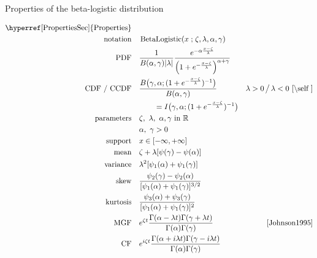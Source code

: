 

\begin{table*}[p]
\caption[Beta-logistic distribution -- Properties]{Properties of the beta-logistic distribution}
\begin{align*}
\text{\hyperref[PropertiesSec]{Properties}}  \quad& \\
\text{notation} \quad &  \op{BetaLogistic}(x\given \pLoc,\pScale,\alpha,\gamma)  
\checked
\\
\text{PDF}\quad &  
\frac{1}{B(\alpha, \gamma) \Left| \pScale\Right|}
 \frac{e^{-\alpha \frac{x-\pLoc}{\pScale} }} { \Left(1 + e^{-\frac{x-\pLoc}{\pScale}  }\Right)^{\alpha+\gamma} }
\checked 
\\
\text{CDF / CCDF} \quad  &  
 \frac{B\big(\gamma, \alpha ;  ( 1+e^{-\frac{x-\pLoc}{\pScale}} )^{-1}  \big) }{B(\alpha,\gamma)}
& \pScale>0 \, \big/ \, \pScale<0 \checked
 \text{ \cite{\self}} \\
& \qquad  = I\big(  \gamma, \alpha;  ( 1+e^{-\frac{x-\pLoc}{\pScale}} )^{-1}  \big) \checked
\\
\text{parameters}\quad &   \pLoc,\ \pScale,\ \alpha, \gamma  \text{ in } \mathbb{R} \checked \\
& \alpha,\ \gamma >0 \checked
\\
\text{support} \quad &   x \in [-\infty,+\infty] \checked
\\
\text{mean} \quad  &  \pLoc +\pScale [ \psi(\gamma)-\psi(\alpha) ]  \checked %
\\
\text{variance} \quad  & \pScale^2 [\psi_1(\alpha) + \psi_1(\gamma) ] \checked %
\\
\text{skew} \quad  &  \frac{ \psi_2(\gamma) - \psi_2(\alpha)}{[\psi_1(\alpha) + \psi_1(\gamma)]^{3/2}} \checked
\\
\text{kurtosis} \quad  &   \frac{\psi_3(\alpha) + \psi_3(\gamma)}{[\psi_1(\alpha) + \psi_1(\gamma)]^{2}} \checked
\\
\text{MGF} \quad  &  e^{ \pLoc t}\frac{\Gamma(\alpha-\pScale  t) \Gamma(\gamma+\pScale t)}{\Gamma(\alpha)\Gamma(\gamma)}
& \text{\cite{Johnson1995}} \checked
\\
\text{CF} \quad  &    e^{i \pLoc t} \frac{\Gamma(\alpha+ i \pScale  t) \Gamma(\gamma-i \pScale t)}{\Gamma(\alpha)\Gamma(\gamma)} \checked
\end{align*}
\end{table*}

